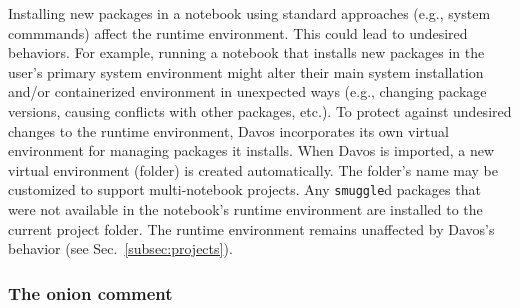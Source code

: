 \documentclass[preprint,12pt,a4paper]{elsarticle}
\begin{document}
Installing new packages in a notebook using standard approaches (e.g., system
commmands) affect the runtime environment. This could lead to undesired
behaviors. For example, running a notebook that installs new packages in the
user's primary system environment might alter their main system installation
and/or containerized environment in unexpected ways (e.g., changing package
versions, causing conflicts with other packages, etc.). To protect against
undesired changes to the runtime environment, Davos incorporates its
own virtual environment for managing packages it installs. When Davos
is imported, a new virtual environment (folder) is created automatically. The
folder's name may be customized to support multi-notebook projects. Any
\texttt{smuggle}d packages that were not available in the notebook's runtime
environment are installed to the current project folder. The runtime
environment remains unaffected by Davos's behavior (see
Sec.~\ref{subsec:projects}).

\subsubsection{The onion comment}\label{subsec:onion}
\end{document}
